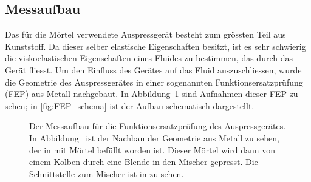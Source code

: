 \subsection{Messaufbau}
Das für die Mörtel verwendete Auspressgerät besteht zum grössten Teil aus Kunststoff. Da dieser selber elastische Eigenschaften besitzt, ist es sehr schwierig die viskoelastischen Eigenschaften eines Fluides zu bestimmen, das durch das Gerät fliesst.
Um den Einfluss des Gerätes auf das Fluid auszuschliessen, wurde die Geometrie des Auspressgerätes in einer sogenannten Funktionsersatzprüfung (FEP) aus Metall nachgebaut. In Abbildung~\ref{fig:FEP} sind Aufnahmen dieser FEP zu sehen; in \ref{fig:FEP_schema} ist der Aufbau schematisch dargestellt.
%
\begin{figure}[hbt]
    \centering
    \caption{Der Messaufbau für die Funktionsersatzprüfung des Auspressgerätes.\\
    In Abbildung~ ist der Nachbau der Geometrie aus Metall zu sehen, der in  mit Mörtel befüllt worden ist.
    Dieser Mörtel wird dann von einem Kolben durch eine Blende in den Mischer gepresst. Die Schnittstelle zum Mischer ist in  zu sehen.}
    \label{fig:FEP}
\end{figure}
